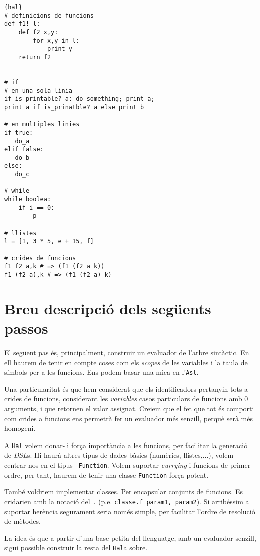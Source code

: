 \documentclass[a4paper,11pt]{article}
\newcommand{\asl}{{\tt Asl}}
\newcommand{\hal}{{\tt Hal}}
\begin{document}
\begin{lstlisting}{hal}
# definicions de funcions
def f1! l:
    def f2 x,y:
        for x,y in l:
            print y
    return f2


# if
# en una sola linia
if is_printable? a: do_something; print a;
print a if is_prinatble? a else print b

# en multiples linies
if true:
   do_a
elif false:
   do_b
else:
   do_c

# while
while boolea:
    if i == 0:
        p

# llistes
l = [1, 3 * 5, e + 15, f]

# crides de funcions
f1 f2 a,k # => (f1 (f2 a k))
f1 (f2 a),k # => (f1 (f2 a) k)
\end{lstlisting}


\section{Breu descripció dels següents passos}
El següent pas és, principalment, construir un evaluador de l'arbre sintàctic.
En ell haurem de tenir en compte coses com els \emph{scopes} de les variables
i la taula de símbols per a les funcions. Ens podem basar una mica en l'\asl.

Una particularitat és que hem considerat que els identificadors
pertanyin tots a crides de funcions, considerant les \emph{variables}
casos particulars de funcions amb 0 arguments, i que retornen el valor
assignat. Creiem que el fet que tot és comporti com crides a funcions ens permetrà
fer un evaluador més senzill, perquè serà més homogeni.

A \hal{} volem donar-li força importància a les funcions, per
facilitar la generació de \emph{DSL}s. Hi haurà altres tipus de dades
bàsics (numèrics, llistes,...), volem centrar-nos en el tipus {\tt
  Function}.  Volem suportar \emph{currying} i funcions de primer
ordre, per tant, haurem de tenir una classe {\tt Function} força
potent.

També voldriem implementar classes. Per encapsular conjunts de
funcions. Es cridarien amb la notació del {\tt .} (p.e. {\tt classe.f
  param1, param2}). Si arribéssim a suportar herència segurament seria
només simple, per facilitar l'ordre de resolució de mètodes.

La idea és que a partir d'una base petita del llenguatge, amb un evaluador
senzill, sigui possible construir la resta del \hal a sobre.
\end{document}
